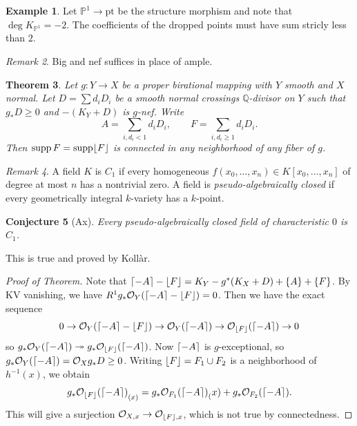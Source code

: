 \documentclass[leqno, openany]{memoir}
\DeclarePairedDelimiter{\floor}{\lfloor}{\rfloor}
\DeclarePairedDelimiter{\ceil}{\lceil}{\rceil}
\newtheorem{thm}{Theorem}[section]
\newtheorem{conj}[thm]{Conjecture}
\theoremstyle{definition}
\newtheorem{exm}[thm]{Example}
\theoremstyle{remark}
\newtheorem{rmk}[thm]{Remark}
\theoremstyle{plain}
\theoremstyle{definition}
\theoremstyle{remark}
\newcommand{\Q}{\mathbb{Q}}
\renewcommand{\P}{\mathbb{P}}
\newcommand{\mc}[1]{\mathcal{#1}}
\newcommand{\mr}[1]{\mathrm{#1}}
\DeclareMathOperator{\supp}{supp}
\begin{document}
\begin{exm}
    Let $\P^1 \to \mr{pt}$ be the structure morphism and note that $\deg K_{\P^1} = -2$. The coefficients of the dropped points must have sum stricly less than $2$.
\end{exm}

\begin{rmk}
    Big and nef suffices in place of ample.
\end{rmk}

\begin{thm}
    Let $g \colon Y \to X$ be a proper birational mapping with $Y$ smooth and $X$ normal. Let $D = \sum d_i D_i$ be a smooth normal crossings $\Q$-divisor on $Y$ such that $g_* D \geq 0$ and $-(K_Y + D)$ is $g$-nef. Write
    \[ A = \sum_{i, d_i < 1} d_i D_i, \qquad F = \sum_{i, d_i \geq 1} d_i D_i. \]
    Then $\supp F = \supp \floor{F}$ is connected in any neighborhood of any fiber of $g$.
\end{thm}

\begin{rmk}
    A field $K$ is $C_1$ if every homogeneous $f(x_0, \ldots, x_n) \in K[x_0, \ldots, x_n]$ of degree at most $n$ has a nontrivial zero. A field is \textit{pseudo-algebraically closed} if every geometrically integral $k$-variety has a $k$-point.
\end{rmk}

\begin{conj}[Ax]
    Every pseudo-algebraically closed field of characteristic $0$ is $C_1$.
\end{conj}

This is true and proved by Koll\`ar.

\begin{proof}[Proof of Theorem]
    Note that $\ceil{-A} - \floor{F} = K_Y - g^*(K_X + D) + \qty{A} + \qty{F}$. By KV vanishing, we have $R^1 g_* \mc{O}_Y(\ceil{-A} - \floor{F}) = 0$. Then we have the exact sequence
    \[ 0 \to \mc{O}_Y(\ceil{-A} - \floor{F}) \to \mc{O}_Y(\ceil{-A}) \to \mc{O}_{\floor{F}}(\ceil{-A}) \to 0 \]
    so $g_* \mc{ O }_Y(\ceil{-A}) \twoheadrightarrow g_* \mc{O}_{\floor{F}}(\ceil{-A})$. Now $\ceil{-A}$ is $g$-exceptional, so $g_* \mc{O}_Y(\ceil{-A}) = \mc{O}_X g_* D \geq 0$. Writing $\floor{F} = F_1 \cup F_2$ is a neighborhood of $h^{-1}(x)$, we obtain
    \[ { g_* \mc{O}_{\floor{F}}(\ceil{-A}) }_{(x)} = { g_* \mc{O}_{F_1} (\ceil{-A}) }_(x) + g_* \mc{O}_{F_2}(\ceil{-A}). \]
    This will give a surjection $\mc{O}_{X, x} \to \mc{O}_{\floor{F}, x}$, which is not true by connectedness.
\end{proof}
\end{document}
